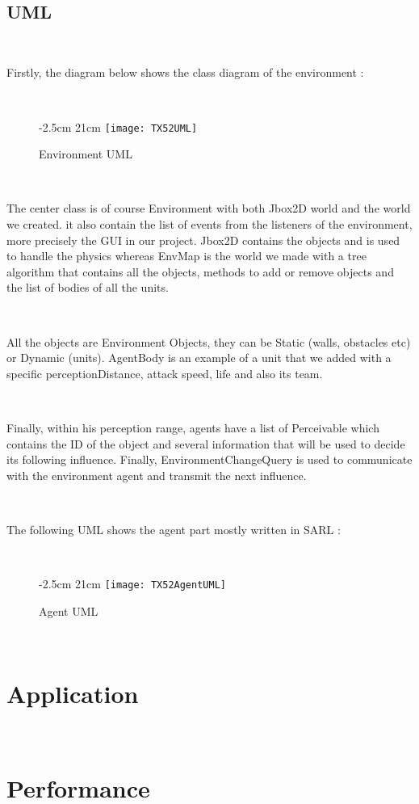 \documentclass[a4paper,10pt]{book}
\begin{document}
~

\subsection{UML}

~

Firstly, the diagram below shows the class diagram of the environment :

~

\begin{figure}[!ht]
  -2.5cm 21cm
 \centering
 \texttt{[image: TX52UML]}
 \caption{Environment UML}
\end{figure}

~

The center class is of course Environment with both Jbox2D world and the world we created. it also contain the list of events
from the listeners of the environment, more precisely the GUI in our project. Jbox2D contains the objects and is used to handle
the physics whereas EnvMap is the world we made with a tree algorithm that contains all the objects, methods to add or remove objects
and the list of bodies of all the units.

~

All the objects are Environment Objects, they can be Static (walls, obstacles etc) or Dynamic (units). AgentBody is an example of a unit
that we added with a specific perceptionDistance, attack speed, life and also its team.

~

Finally, within his perception range, agents have a list of Perceivable which contains the ID of the object and several information that
will be used to decide its following influence. Finally, EnvironmentChangeQuery is used to communicate with the environment agent and transmit
the next influence.

~

\newpage

The following UML shows the agent part mostly written in SARL :

~

\begin{figure}[!ht]
  -2.5cm 21cm
 \centering
 \texttt{[image: TX52AgentUML]}
 \caption{Agent UML}
\end{figure}

~

\section {Application}

~

\section {Performance}
\end{document}
